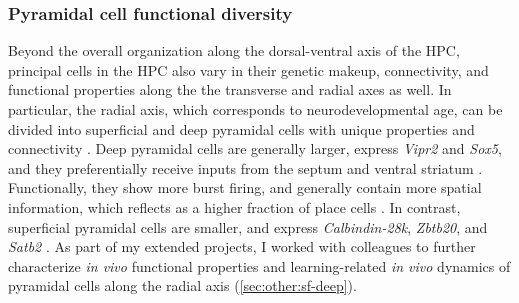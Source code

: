 \subsubsection{Pyramidal cell functional diversity}
\label{sec:intro:memory:diversity}
Beyond the overall organization along the dorsal-ventral axis of the \ac{HPC}, principal cells in the \ac{HPC} also vary in their genetic makeup, connectivity, and functional properties along the the transverse \citep{Igarashi2014} and radial \citep{Slomianka2011} axes as well.
In particular, the radial axis, which corresponds to neurodevelopmental age, can be divided into superficial and deep pyramidal cells with unique properties and connectivity \citep{Angevine1965, Schlessinger1978, Deguchi2011}. 
Deep pyramidal cells are generally larger, express \emph{Vipr2} and \emph{Sox5}, and they preferentially receive inputs from the septum and ventral striatum \citep{Nielsen2010, Sorensen1993, Sorensen1995}.
Functionally, they show more burst firing, and generally contain more spatial information, which reflects as a higher fraction of place cells \citep{Mizuseki2011}.
In contrast, superficial pyramidal cells are smaller, and express \emph{Calbindin-28k}, \emph{Zbtb20}, and \emph{Satb2} \citep{Sloviter1989, Slomianka1992}.
As part of my extended projects, I worked with colleagues to further characterize \emph{in vivo} functional properties and learning-related \emph{in vivo} dynamics of pyramidal cells along the radial axis (\autoref{sec:other:sf-deep}).

